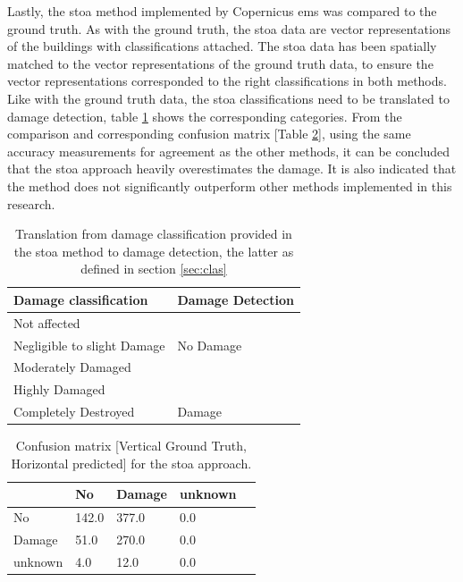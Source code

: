 \noindent Lastly, the \ac{stoa} method implemented by Copernicus \ac{ems} was compared to the ground truth. As with the ground truth, the \ac{stoa} data are vector representations of the buildings with classifications attached. The \ac{stoa} data has been spatially matched to the vector representations of the ground truth data, to ensure the vector representations corresponded to the right classifications in both methods. Like with the ground truth data, the \ac{stoa} classifications need to be translated to damage detection, table \ref{tab:clastrans2} shows the corresponding categories. From the comparison and corresponding confusion matrix [Table \ref{tab:confcop}], using the same accuracy measurements for agreement as the other methods, it can be concluded that the \ac{stoa} approach heavily overestimates the damage. It is also indicated that the method does not significantly outperform other methods implemented in this research.  

\begin{table} [H]
	\centering
	\footnotesize
	\captionsetup{justification=raggedright,singlelinecheck=false}
	\caption{\footnotesize{Translation from damage classification provided in the \ac{stoa} method to damage detection, the latter as defined in section \ref{sec:clas}}}	
	\begin{tabular}{ll}
		\toprule
		Damage classification & Damage Detection \\
		\midrule			
		Not affected &\\
		Negligible to slight Damage & No Damage\\
		\midrule	
		Moderately Damaged &\\
		Highly Damaged & \\
		Completely Destroyed & Damage\\
		\bottomrule
	\end{tabular}
	\label{tab:clastrans2}
\end{table} 

\begin{table} [H]
	\centering
	\footnotesize
	\captionsetup{justification=raggedright,singlelinecheck=false}
	\caption{Confusion matrix [Vertical Ground Truth, Horizontal predicted] for the \ac{stoa} approach. }	
	\begin{tabular}{l|llll}
		& No    & Damage & unknown &  \\ \hline
		No      & 142.0 & 377.0  & 0.0     &  \\
		Damage  & 51.0  & 270.0  & 0.0     &  \\
		unknown & 4.0   & 12.0   & 0.0     &  \\
	\end{tabular}
	\label{tab:confcop}
\end{table}

